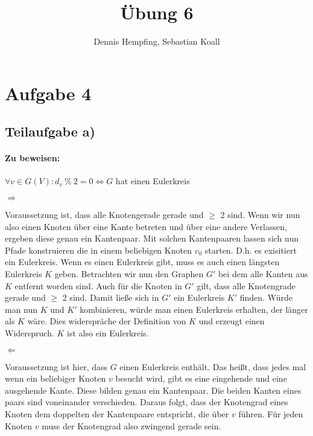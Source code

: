 \documentclass[12pt]{scrartcl}%
\theoremstyle{nonumberplain}
\begin{document}
\author{Dennis Hempfing, Sebastian Koall}
\title{Übung 6}
\date{} 
\pagestyle{myheadings}

\maketitle %
 
\section*{Aufgabe 4}

\subsection*{Teilaufgabe a)}

\paragraph{Zu beweisen:} $\forall v \in G(V): d_v \ \% \ 2 = 0 \Leftrightarrow G$ hat einen Eulerkreis

$\Rightarrow$

Voraussetzung ist, dass alle Knotengerade gerade und $\ge$ 2 sind. Wenn wir nun also einen Knoten über eine Kante betreten und über eine andere Verlassen, ergeben diese genau ein Kantenpaar. Mit solchen Kantenpaaren lassen sich nun Pfade konstruieren die in einem beliebigen Knoten $v_0$ starten. D.h. es exisitiert ein Eulerkreis. Wenn es einen Eulerkreis gibt, muss es auch einen längsten Eulerkreis $K$ geben. Betrachten wir nun den Graphen $G'$ bei dem alle Kanten aus $K$ entfernt worden sind. Auch für die Knoten in $G'$ gilt, dass alle Knotengrade gerade und $\ge$ 2 sind. Damit ließe sich in $G'$ ein Eulerkreis $K'$ finden. Würde man nun $K$ und $K'$ kombinieren, würde man einen Eulerkreis erhalten, der länger als $K$ wäre. Dies widerspräche der Definition von $K$ und erzeugt einen Widerspruch. $K$ ist also ein Eulerkreis.

$\Leftarrow$

Voraussetzung ist hier, dass $G$ einen Eulerkreis enthält. Das heißt, dass jedes mal wenn ein beliebiger Knoten $v$ besucht wird, gibt es eine eingehende und eine ausgehende Kante. Diese bilden genau ein Kantenpaar. Die beiden Kanten eines paars sind voneinander verschieden. Daraus folgt, dass der Knotengrad eines Knoten dem doppelten der Kantenpaare entspricht, die über $v$ führen. Für jeden Knoten $v$ muss der Knotengrad also zwingend gerade sein.
\end{document}
